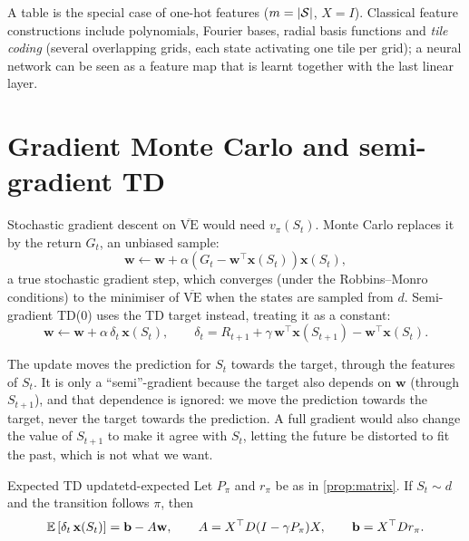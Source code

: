 A table is the special case of one-hot features ($m = \left\lvert \mathcal{S} \right\rvert$, $X =
I$). Classical feature constructions include polynomials, Fourier bases,
radial basis functions and \emph{tile coding} (several overlapping grids,
each state activating one tile per grid); a neural network can be seen as
a feature map that is learnt together with the last linear layer.

\section{Gradient Monte Carlo and semi-gradient TD}

Stochastic gradient descent on $\overline{\mathrm{VE}}$ would need
$v_\pi(S_t)$. Monte Carlo replaces it by the return $G_t$, an unbiased
sample:
\begin{equation}
  \mathbf{w} \gets \mathbf{w} + \alpha \left( G_t - \mathbf{w}^\top
  \mathbf{x}(S_t) \right) \mathbf{x}(S_t),
\end{equation}
a true stochastic gradient step, which converges (under the Robbins--Monro
conditions) to the minimiser of $\overline{\mathrm{VE}}$ when the states
are sampled from $d$. Semi-gradient TD(0) uses the TD target instead,
treating it as a constant:
\begin{equation}
  \label{eq:linear-td}
  \mathbf{w} \gets \mathbf{w} + \alpha\, \delta_t\, \mathbf{x}(S_t),
  \qquad
  \delta_t = R_{t+1} + \gamma\, \mathbf{w}^\top \mathbf{x}(S_{t+1}) -
  \mathbf{w}^\top \mathbf{x}(S_t).
\end{equation}

\begin{intuition}
  The update moves the prediction for $S_t$ towards the target, through the
  features of $S_t$. It is only a ``semi''-gradient because the target also
  depends on $\mathbf{w}$ (through $S_{t+1}$), and that dependence is
  ignored: we move the prediction towards the target, never the target
  towards the prediction. A full gradient would also change the value of
  $S_{t+1}$ to make it agree with $S_t$, letting the future be distorted to
  fit the past, which is not what we want.
\end{intuition}

\begin{proposition}{Expected TD update}{td-expected}
  Let $P_\pi$ and $r_\pi$ be as in \cref{prop:matrix}. If $S_t \sim d$ and
  the transition follows $\pi$, then
  \begin{equation}
    \mathbb{E}\left[\delta_t\, \mathbf{x}(S_t)\right] = \mathbf{b} - A \mathbf{w},
    \qquad A = X^\top D (I - \gamma P_\pi) X, \qquad \mathbf{b} = X^\top D
    r_\pi.
  \end{equation}
\end{proposition}

